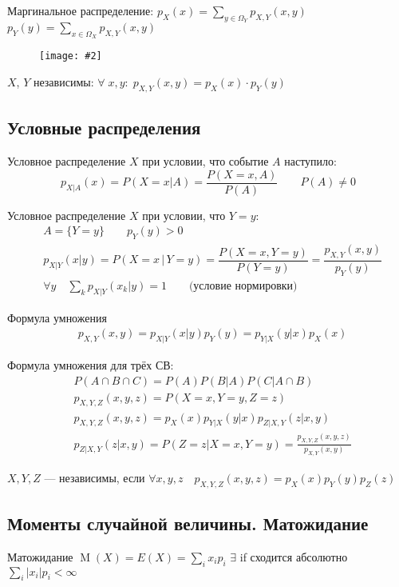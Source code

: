 \documentclass[a4paper,12pt,fleqn]{article}
\numberwithin{figure}{section}
\newcommand\cfigure[2]{
	\begin{figure}[H] \centering \texttt{[image: \#2]} \end{figure}
}
\theoremstyle{definition}
\DeclareMathOperator{\M}{M}
\begin{document}
Маргинальное распределение:
$p_X(x) = \!\!\sum_{y \in \Omega_Y} p_{X,Y}(x,y)$ \quad
$p_Y(y) = \!\!\sum_{x \in \Omega_X} p_{X,Y}(x,y)$
\cfigure{11cm}{marginal-distribs.png}

$X$, $Y$ независимы: $\forall \; x,y: \; p_{X,Y}(x,y)=p_X(x) \cdot p_Y(y)$


\subsection{Условные распределения}

Условное распределение $X$ при условии, что событие $A$ наступило:
\[ p_{X|A}(x)=P(X=x|A)=\dfrac{P(X=x,A)}{P(A)} \qquad P(A) \ne 0 \]

Условное распределение $X$ при условии, что $Y=y$:
\begin{align*}
&	A=\{Y=y\}	\qquad p_Y(y)>0 \\
&	p_{X|Y}(x|y) = P(X=x\,|\,Y=y) = \dfrac{P(X=x,Y=y)}{P(Y=y)} = \dfrac{p_{X,Y}(x,y)}{p_Y(y)} \\
&	\forall y \quad \sum_k p_{X|Y}(x_k|y)=1		\qquad \text{(условие нормировки)}
\end{align*}

Формула умножения
\begin{align*}
&	p_{X,Y}(x,y) = p_{X|Y}(x|y) p_Y(y) = p_{Y|X}(y|x) p_X(x)
\end{align*}

Формула умножения для трёх СВ:
\begin{align*}
&	P(A \cap B \cap C) = P(A) P(B|A) P(C|A \cap B) \\
&	p_{X,Y,Z}(x,y,z) = P(X=x, Y=y, Z=z) \\
&	p_{X,Y,Z}(x,y,z) = p_X(x) p_{Y|X}(y|x) p_{Z|X,Y}(z|x,y) \\
&	p_{Z|X,Y}(z|x,y) = P(Z=z|X=x,Y=y) = \frac{p_{X,Y,Z}(x,y,z)}{p_{X,Y}(x,y)}
\end{align*}

$X,Y,Z$ --- независимы, если $\forall x,y,z \quad p_{X,Y,Z}(x,y,z) = p_X(x)p_Y(y)p_Z(z)$


\subsection{Моменты случайной величины. Матожидание}

Матожидание $\M(X) = E(X) = \sum_i x_i p_i$
\quad $\exists$ if сходится абсолютно $\sum_i |x_i|p_i < \infty$
\end{document}
